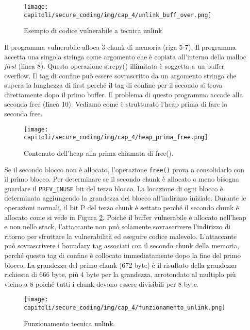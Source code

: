 \begin{figure}[H]
    \centering
    \texttt{[image: capitoli/secure\_coding/img/cap\_4/unlink\_buff\_over.png]}
    \caption{Esempio di codice vulnerabile a tecnica unlink.}\label{fig:ulink_buff_over}
\end{figure}

Il programma vulnerabile alloca 3 chunk di memoria (riga 5-7). Il programma accetta
una singola stringa come argomento che è copiata all'interno della malloc \textit{first} (linea 8).
Questa operazione strcpy() illimitata è soggetta a un buffer overflow.
Il tag di confine può essere sovrascritto da un argomento stringa che supera la
lunghezza di first perché il tag di confine per il secondo si trova direttamente dopo
il primo buffer. Il problema di questo programma accade alla seconda free (linea 10).
Vediamo come è strutturato l'heap prima di fare la seconda free.

\begin{figure}[H]
    \centering
    \texttt{[image: capitoli/secure\_coding/img/cap\_4/heap\_prima\_free.png]}
    \caption{Contenuto dell'heap alla prima chiamata di free().}\label{fig:heap_prima_free}
\end{figure}

Se il secondo blocco non è allocato, l'operazione \verb|free()| prova a consolidarlo
con il primo blocco. Per determinare se il secondo chunk è allocato o meno bisogna
guardare il \verb|PREV_INUSE| bit del terzo blocco. La locazione di ogni blocco è
determinata aggiungendo la grandezza del blocco all'indirizzo iniziale.
Durante le operazioni normali, il bit P del terzo chunk è settato perché il secondo
chunk è allocato come si vede in Figura \ref{fig:heap_prima_free}.
Poiché il buffer vulnerabile è allocato nell'heap e non nello stack, l'attaccante non
può solamente sovrascrivere l'indirizzo di ritorno per sfruttare la vulnerabilità ed
eseguire codice malevolo. L'attaccante può sovrascrivere i boundary tag associati
con il secondo chunk della memoria, perché questo tag di confine è collocato
immediatamente dopo la fine del primo blocco. La grandezza del primo chunk (672 byte)
è il risultato della grandezza richiesta di 666 byte, più 4 byte per la grandezza,
arrotondato al multiplo più vicino a 8 poiché tutti i chunk devono essere divisibili
per 8 byte.

\begin{figure}[H]
    \centering
    \texttt{[image: capitoli/secure\_coding/img/cap\_4/funzionamento\_unlink.png]}
    \caption{Funzionamento tecnica unlink.}\label{fig:funzionamento_unlink}
\end{figure}

